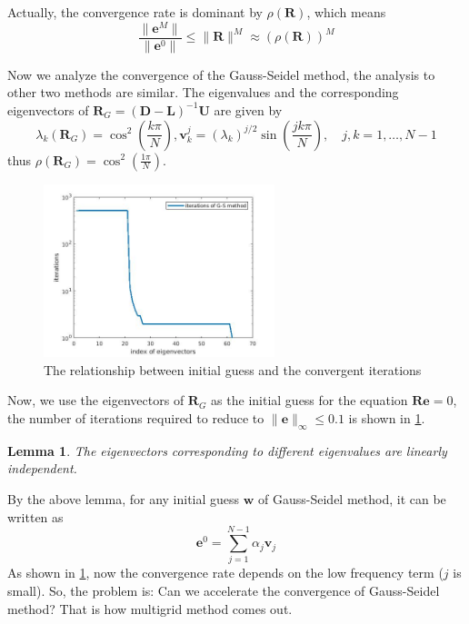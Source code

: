 \documentclass[onecolumn, conference]{IEEEtran}
\newtheorem{lemma}{Lemma}
\begin{document}
Actually, the convergence rate is dominant by $\rho(\mathbf{R})$, which means
\begin{equation}
    \frac{\|\mathbf{e}^M\|}{\|\mathbf{e}^0\|}\leq \|\mathbf{R}\|^M\approx \left(\rho(\mathbf{R})\right)^M
\end{equation}

Now we analyze the convergence of the Gauss-Seidel method, the analysis to other two methods are similar. The eigenvalues and the corresponding eigenvectors of $\mathbf{R}_G=\left(\mathbf{D}-\mathbf{L}\right)^{-1}\mathbf{U}$ are given by
\begin{equation}
    \lambda_k(\mathbf{R}_G)=\cos^2\left(\frac{k\pi}{N}\right), \mathbf{v}_k^{j}=(\lambda_k)^{j/2}\sin\left(\frac{jk\pi}{N}\right),\quad j,k=1,\dots,N-1
\end{equation}
thus $\rho(\mathbf{R}_G)=\cos^2\left(\frac{1\pi}{N}\right)$.
\begin{figure}[htbp]
    \centering
    \includegraphics[width=0.6\textwidth]{G_S_iterations.jpg}
    \caption{The relationship between initial guess and the convergent iterations}
    \label{fig:G_S_iterations}
\end{figure}
Now, we use the eigenvectors of $\mathbf{R}_G$ as the initial guess for the equation $\mathbf{R}\mathbf{e}=0$, the number of iterations required to reduce to $\|\mathbf{e}\|_\infty\leq 0.1$ is shown in \ref{fig:G_S_iterations}. 
\begin{lemma}
    The eigenvectors corresponding to different eigenvalues are linearly independent.
\end{lemma} 
By the above lemma, for any initial guess $\mathbf{w}$ of Gauss-Seidel method, it can be written as 
\begin{equation}
    \mathbf{e}^0=\sum_{j=1}^{N-1}\alpha_j\mathbf{v}_j
\end{equation}
As shown in \ref{fig:G_S_iterations}, now the convergence rate depends on the low frequency term ($j$ is small). So, the problem is: Can we accelerate the convergence of Gauss-Seidel method? That is how multigrid method comes out.
\end{document}
